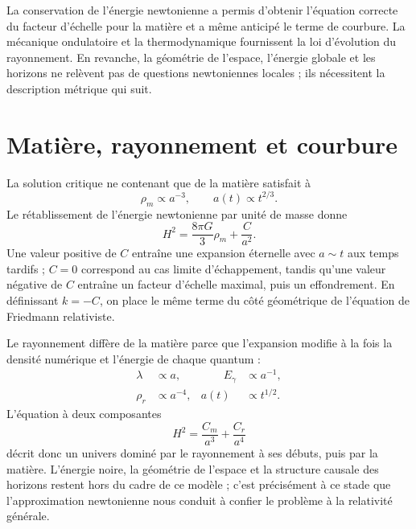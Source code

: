 \begin{classroomqa}
\end{classroomqa}

La conservation de l’énergie newtonienne a permis d’obtenir l’équation correcte du facteur d’échelle pour la matière et a même anticipé le terme de courbure. La mécanique ondulatoire et la thermodynamique fournissent la loi d’évolution du rayonnement. En revanche, la géométrie de l’espace, l’énergie globale et les horizons ne relèvent pas de questions newtoniennes locales ; ils nécessitent la description métrique qui suit.

\section{Matière, rayonnement et courbure}

La solution critique ne contenant que de la matière satisfait à
\begin{equation}
\rho_m\propto a^{-3},
\qquad
a(t)\propto t^{2/3}.
\end{equation}
Le rétablissement de l’énergie newtonienne par unité de masse donne
\begin{equation}
H^2=\frac{8\pi G}{3}\rho_m+\frac{C}{a^2}.
\end{equation}
Une valeur positive de \(C\) entraîne une expansion éternelle avec \(a\sim t\) aux temps tardifs ; \(C=0\) correspond au cas limite d’échappement, tandis qu’une valeur négative de \(C\) entraîne un facteur d’échelle maximal, puis un effondrement. En définissant \(k=-C\), on place le même terme du côté géométrique de l’équation de Friedmann relativiste.

Le rayonnement diffère de la matière parce que l’expansion modifie à la fois la densité numérique et l’énergie de chaque quantum :
\begin{equation}
\begin{aligned}
\lambda&\propto a,
&\qquad E_\gamma&\propto a^{-1},\\
\rho_r&\propto a^{-4},
& a(t)&\propto t^{1/2}.
\end{aligned}
\end{equation}
L’équation à deux composantes
\begin{equation}
H^2=\frac{C_m}{a^3}+\frac{C_r}{a^4}
\end{equation}
décrit donc un univers dominé par le rayonnement à ses débuts, puis par la matière. L’énergie noire, la géométrie de l’espace et la structure causale des horizons restent hors du cadre de ce modèle ; c’est précisément à ce stade que l’approximation newtonienne nous conduit à confier le problème à la relativité générale.
